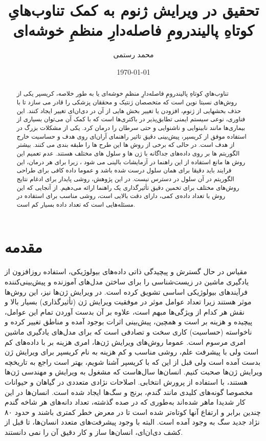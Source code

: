 \documentclass[12pt,a4paper,BCOR=.7cm,headsepline,bibliography=totoc]{report}
\title{تحقیق در ویرایش ژنوم به کمک تناوب‌هایِ کوتاهِ پالیندرومِ فاصله‌دارِ منظمِ خوشه‌ای}
\author{محمد رستمی }
\date{\today}
\begin{document}
\makethesistitle
{}
\begin{abstract}
تناوب‌هایِ کوتاهِ پالیندرومِ فاصله‌دارِ منظمِ خوشه‌ای یا به طور خلاصه، کریسپر  یکی از روش‌های نسبتا نوین است که متخصصان ژنتیک و محققان پزشکی را قادر می سازد تا با حذف بخشهایی از ژنوم،
افزودن یا تغییر بخش هایی از آن در دی‌ان‌ای  تغییر ایجاد کنند. این فناوری، نوعی سیستم ایمنی تطابق‌پذیر در باکتری‌ها است که با کمک آن می‌توان بسیاری از بیماری‌ها مانند نابینوایی و ناشنوایی و حتی سرطان را درمان کرد. یکی از مشکلات بزرگ در استفاده موفق از کریسپر، پیش‌بینی دقیق تاثیر راهنمای آر‌ان‌ای  روی هدف و حساسیت خارج از هدف است. در حالی که برخی از روش ها این طرح ها را طبقه بندی می کنند. بیشتر
الگوریتم ها بر روی داده‌های جداگانه با ژن ها و سلول های مختلف هستند. عدم تعمیم این روش ها
مانع استفاده از این راهنما در آزمایشات بالینی می شود ، زیرا برای هر درمان، این فرایند باید دقیقا برای همان سلول درست شده باشد و عموما داده کافی برای طراحی الگوریتم در آن سلول در دسترس نیست. در این پژوهش، روشی پایدار برای ادغام نتایج روش‌های مختلف برای تخمین دقیق تأثیرگذاری یک راهنما ارائه می‌دهیم. از آنجایی که این روش با تعداد داده‌ی کمی، دارای دقت بالایی است، روشی مناسب برای استفاده در مسئله‌هایی است که تعداد داده بسیار کم است.
\end{abstract}
\pagestyle{plain}

\tableofcontents{} \listoffigures{}
\chapter{مقدمه}
\pagestyle{fancy} 
مقیاس در حال گسترش و پیچیدگی ذاتی داده‌های بیولوژیکی، استفاده روزافزون از یادگیری ماشین در زیست‌شناسی را برای ساختن مدل‌های آموزنده و پیش‌بینی‌کننده فرآیندهای بیولوژیکی اساسی تشویق کرده است. در ویرایش ژن‌ها نیز، این روش‌ها موثر هستند زیرا تعداد عوامل موثر در موفقیت ویرایش ژن (تأثیرگذاری) بسیار بالا و نقش هر کدام از ویژگی‌ها مبهم است، علاوه بر آن بدست آوردن تمام این عوامل، پیچیده و هزینه بر است و همچین، پیش‌بینی اثرات بوجود آمده و مناطق تغییر کرده و ناخواسته (حساسیت) کاری سخت و تصادفی است که برای مدل‌های یادگیری ماشین امری مرسوم است. عموما روش‌های ویرایش ژن‌ها، امری هزینه بر با داده‌های کم است ولی با پیشرفت علم، روشی مناسب و کم هزینه به نام کریسپر برای ویرایش ژن بدست آمده است ولی قبل از این که با کریسپر آشنا شویم، بهتر است راجع به تاریخچه ویرایش ژن‌ها صحبت کنیم. انسان‌ها سال‌هاست که مشغول به ویرایش و مهندسی ژن‌ها هستند، با استفاده از پرورش انتخابی.
	اصلاحات نژادی متعددی در گیاهان و حیوانات مخصوصا گونه‌های کلیدی مانند گندم، برنج و سگ‌ها ایجاد شده است. انسان‌ها در این کار شدیدا ماهر شده‌اند به‌طوری که در صده گذشته، تعداد دانه‌های هر شاخه گندم چندین برابر و ارتفاع آنها کوتاه‌تر شده است تا در معرض خطر کمتری باشند و حدود ۸۰ نژاد جدید سگ به وجود آمده است. البته با وجود پیشرفت‌های متعدد انسان‌ها، تا قبل از کشف دی‌ان‌ای، انسان‌ها ساز و کار دقیق آن را نمی دانستند. 
\end{document}
